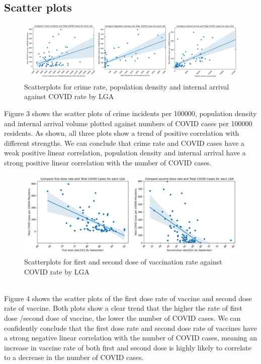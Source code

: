 \documentclass[a4, 11pt]{article}
\begin{document}
\subsection{Scatter plots}
\begin{figure}[ht]
    \centering
    \includegraphics[width=1\textwidth]{graph/three in one scatterplot.png}
    \caption {Scatterplots for crime rate, population density and internal arrival against COVID rate by LGA}
    \label{fig:my_label}
\end{figure}
Figure 3 shows the scatter plots of crime incidents per 100000, population density and internal arrival volume plotted against numbers of COVID cases per 100000 residents. As shown, all three plots show a trend of positive correlation with different strengths. We can conclude that crime rate and COVID cases have a weak positive linear correlation, population density and internal arrival have a strong positive linear correlation with the number of COVID cases.
\begin{figure}[ht]
    \centering
    \includegraphics[width=1\textwidth]{graph/two in one scatterplot.png}
    \caption{Scatterplots for first and second dose of vaccination rate against COVID rate by LGA}
    \label{fig:my_label}
\end{figure}
\\
Figure 4 shows the scatter plots of the first dose rate of vaccine and second dose rate of vaccine. Both plots show a clear trend that the higher the rate of first dose /second dose of vaccine, the lower the number of COVID cases. We can confidently conclude that the first dose rate and second dose rate of vaccines have a strong negative linear correlation with the number of COVID cases, meaning an increase in vaccine rate of both first and second dose is highly likely to correlate to a decrease in the number of COVID cases.
\end{document}
